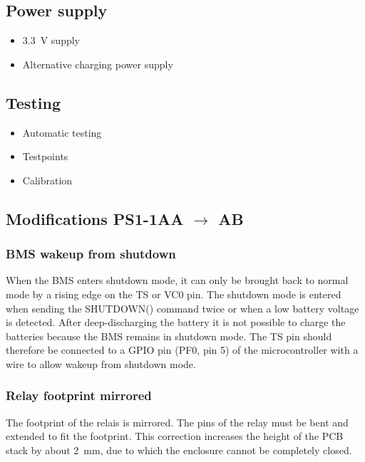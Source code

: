 \FloatBarrier

\subsection{Power supply}
\label{sec_power_supply}
\begin{itemize}
    \item \qty{3.3}{\volt} supply
    \item Alternative charging power supply
\end{itemize}

\FloatBarrier

\subsection{Testing}
\label{sec_testing}
\begin{itemize}
    \item Automatic testing
    \item Testpoints
    \item Calibration
\end{itemize}

\FloatBarrier

\subsection{Modifications PS1-1AA $\to$ AB}

\subsubsection{BMS wakeup from shutdown}
When the BMS enters shutdown mode, it can only be brought back to normal mode by a rising edge on the TS or VC0 pin. The shutdown mode is entered when sending the SHUTDOWN() command twice or when a low battery voltage is detected. After deep-discharging the battery it is not possible to charge the batteries because the BMS remains in shutdown mode. The TS pin should therefore be connected to a GPIO pin (PF0, pin 5) of the microcontroller with a wire to allow wakeup from shutdown mode. 

\subsubsection{Relay footprint mirrored}
The footprint of the relais is mirrored. The pins of the relay must be bent and extended to fit the footprint. This correction increases the height of the PCB stack by about \qty{2}{\milli\meter}, due to which the enclosure cannot be completely closed. 

